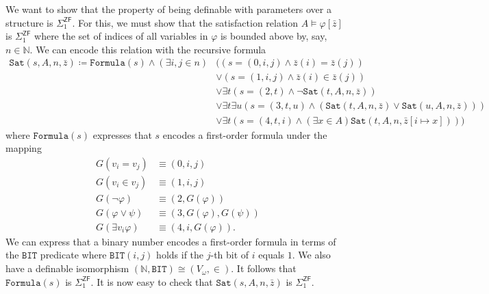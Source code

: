 \documentclass[10pt,letterpaper,cm]{nupset}
\theoremstyle{definition}
\theoremstyle{theorem}
\theoremstyle{remark}
\newcommand{\N}{\mathbb N}
\newcommand{\1}{\mathbf{1}}
\newcommand{\0}{\vec 0}
\newcommand{\zf}{\mathsf{ZF}}
\begin{document}
We want to show that the property of being definable with parameters over a structure is $\Sigma_1^{\zf}$. For this, we must show that the satisfaction relation $A \models \varphi \left[\bar{z}\right]$ is $\Sigma_1^{\zf}$  where the set of indices of all variables in $\varphi$ is bounded above by, say, $n\in \N$. We can encode this relation with the recursive formula
\begin{align*}
\mathtt{Sat}(s, A, n, \bar{z}) \coloneqq  \mathtt{Formula}(s) \land  \left(\exists{i,j\in n}\right) & \bigl( \left(s = \left(0, i,j\right) \land \bar{z}(i) = \bar{z}(j) \right)
\\ & \vee
\left(s = \left(1, i,j\right) \land \bar{z}(i) \in \bar{z}(j)\right)
\\ &  \vee \exists{t}\left(s = \left(2, t\right) \land \neg{\mathtt{Sat}(t, A, n, \bar{z})} \right) 
\\ & \vee \exists{t}\exists{u}\left( s = \left(3, t, u\right) \land \left(\mathtt{Sat}(t, A, n , \bar{z}) 
 \vee \mathtt{Sat}(u, A, n , \bar{z}) \right)\right) 
 \\ &  \vee  \exists{t}\left( s = \left(4, t, i\right) \land \left(\exists{x \in A}\right)\mathtt{Sat}(t, A, n, \bar{z}\left[i \mapsto x\right])\right) \bigr)
\end{align*}
where $\mathtt{Formula}(s)$ expresses that $s$ encodes a first-order formula under the mapping
\begin{align*}
G(v_i = v_j) &\equiv \left(0,i,j\right)
\\ G(v_i \in v_j) &\equiv \left(1, i,j\right)
\\ G(\neg{\varphi}) &\equiv \left(2, G(\varphi)\right)
\\ G(\varphi \vee \psi) &\equiv \left(3, G(\varphi), G(\psi)\right)
\\ G(\exists{v_i}{\varphi}) &\equiv \left(4, i, G(\varphi)\right)
.\end{align*}
We can express that a binary number encodes a first-order formula in terms of the $\mathtt{BIT}$ predicate where $\mathtt{BIT}(i,j)$ holds if the $j$-th bit of $i$ equals $1$.  We also have a definable isomorphism $\left(\N, \mathtt{BIT}\right) \cong \left(V_{\omega}, \in\right)$.  It follows that $\mathtt{Formula}(s)$ is $\Sigma_1^{\zf}$. It is now easy to check that $\mathtt{Sat}(s, A, n, \bar{z})$ is $\Sigma_1^{\zf}$.
\end{document}
